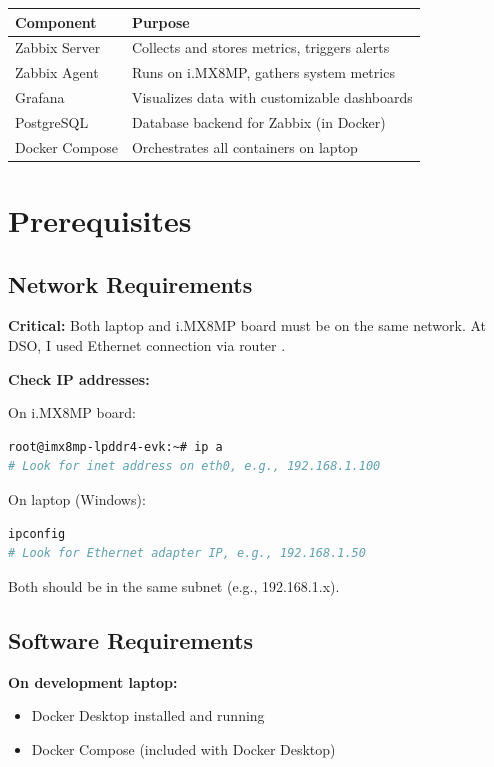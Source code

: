 \documentclass[12pt,a4paper]{report}
\begin{document}
\begin{center}
\begin{tabular}{|l|p{9cm}|}
\hline
\textbf{Component} & \textbf{Purpose} \\
\hline
Zabbix Server & Collects and stores metrics, triggers alerts \\
\hline
Zabbix Agent & Runs on i.MX8MP, gathers system metrics \\
\hline
Grafana & Visualizes data with customizable dashboards \\
\hline
PostgreSQL & Database backend for Zabbix (in Docker) \\
\hline
Docker Compose & Orchestrates all containers on laptop \\
\hline
\end{tabular}
\end{center}

\section{Prerequisites}

\subsection{Network Requirements}

\begin{important}
\textbf{Critical:} Both laptop and i.MX8MP board must be on the same network. At DSO, I used Ethernet connection via router .
\end{important}

\textbf{Check IP addresses:}

On i.MX8MP board:
\begin{lstlisting}[language=bash]
root@imx8mp-lpddr4-evk:~# ip a
# Look for inet address on eth0, e.g., 192.168.1.100
\end{lstlisting}

On laptop (Windows):
\begin{lstlisting}[language=bash]
ipconfig
# Look for Ethernet adapter IP, e.g., 192.168.1.50
\end{lstlisting}

Both should be in the same subnet (e.g., 192.168.1.x).

\subsection{Software Requirements}

\textbf{On development laptop:}
\begin{itemize}
    \item Docker Desktop installed and running
    \item Docker Compose (included with Docker Desktop)
\end{itemize}
\end{document}

